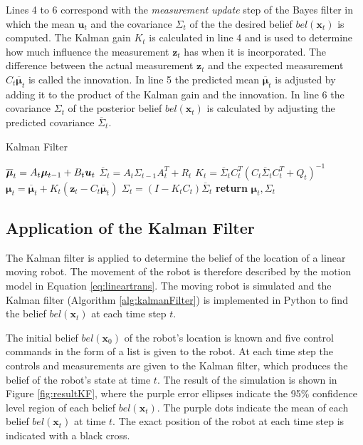 \documentclass[12pt,oneside,openany,a4paper, %
afrikaans,english,
]{memoir}
\numberwithin{equation}{chapter}
\begin{document}
{Lines 4 to 6 correspond with the \textit{measurement update} step of the Bayes filter in which the mean $\bm{u}_t$ and the covariance $\Sigma_t $ of the the desired belief $bel(\bm{x}_t)$ is computed. The Kalman gain $K_t$ is calculated in line 4 and is used to determine how much influence the measurement $\bm{z}_t$ has when it is incorporated. The difference between the actual measurement $\bm{z}_t$ and the expected measurement $C_t \bm{\overline{\mu}}_t$ is called the innovation. In line 5 the predicted mean $\overline{\bm{\mu}}_t$ is adjusted by adding it to the product of the Kalman gain and the innovation. In line 6 the covariance $\Sigma_t$ of the posterior belief $bel(\bm{x}_t)$ is calculated by adjusting the predicted covariance $\overline{\Sigma}_t$. 
\begin{algorithm}
\caption{Kalman Filter}\label{alg:kalmanFilter}
\begin{algorithmic}[1]
\State $\overline{\bm{\mu}}_t = A_t \bm{\mu}_{t-1} + B_t \bm{u_}t$
\State $\overline{\Sigma}_t = A_t \Sigma_{t-1} A_t^T + R_t$
\State $K_t = \overline{\Sigma}_t C_t^T(C_t\overline{\Sigma}_t C_t^T + Q_t)^{-1}$
\State $\bm{\mu}_t = \overline{\bm{\mu}}_t + K_t(\bm{z}_t - C_t \overline{\bm{\mu}}_t)$
\State $\Sigma_t = (I - K_tC_t)\overline{\Sigma}_t$
\State \textbf{return} $\bm{\mu}_t, \Sigma_t$
\EndProcedure
\end{algorithmic}
\end{algorithm}

\subsection{Application of the Kalman Filter}\label{subsec:appEKF}
The Kalman filter is applied to determine the belief of the location of a linear moving robot. The movement of the robot is therefore described by the motion model in Equation \ref{eq:lineartrans}. The moving robot is simulated and the Kalman filter (Algorithm \ref{alg:kalmanFilter}) is implemented in Python to find the belief $bel(\bm{x}_t)$ at each time step $t$.

The initial belief $bel(\bm{x}_0)$ of the robot's location is known and five control commands in the form of a list is given to the robot. At each time step the controls and measurements are given to the Kalman filter, which produces the belief of the robot's state at time $t$. The result of the simulation is shown in Figure \ref{fig:resultKF}, where the purple error ellipses indicate the 95\% confidence level region of each belief $bel(\bm{x}_t)$. The purple dots indicate the mean of each belief $bel(\bm{x}_t)$ at time $t$. The exact position of the robot at each time step is indicated with a black cross.

}
\end{document}
